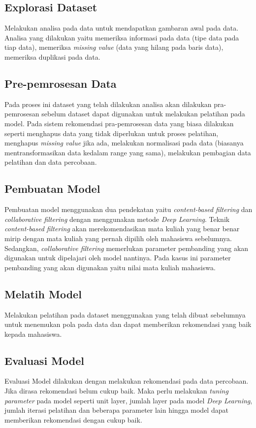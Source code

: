 \begin{adjustwidth}{1em}{0pt}

  \subsection{Explorasi Dataset}
  Melakukan analisa pada data untuk mendapatkan gambaran awal pada data. Analisa yang dilakukan yaitu
  memeriksa informasi pada data (tipe data pada tiap data), memeriksa \emph{missing value} {(data yang hilang pada baris data)},
  memeriksa duplikasi pada data.

  \subsection{Pre-pemrosesan Data}
  Pada proses ini dataset yang telah dilakukan analisa akan dilakukan pra-pemrosesan sebelum dataset dapat digunakan
  untuk melakukan pelatihan pada model. Pada sistem rekomendasi pra-pemrosesan data yang biasa dilakukan seperti menghapus data
  yang tidak diperlukan untuk proses pelatihan, menghapus \emph{missing value} jika ada, melakukan normalisasi pada data (biasanya mentransformasikan data kedalam range yang sama),
  melakukan pembagian data pelatihan dan data percobaan.

  \subsection{Pembuatan Model}
  Pembuatan model menggunakan dua pendekatan yaitu \emph{content-based filtering} dan \emph{collaborative filtering} dengan menggunakan metode \emph{Deep Learning}. Teknik
  \emph{content-based filtering} akan merekomendasikan mata kuliah yang benar benar mirip dengan mata kuliah yang pernah dipilih oleh mahasiswa sebelumnya. Sedangkan, \emph{collaborative filtering}
  memerlukan parameter pembanding yang akan digunakan untuk dipelajari oleh model nantinya. Pada kasus ini parameter pembanding yang akan digunakan yaitu nilai mata kuliah mahasiswa.

  \subsection{Melatih Model}
  Melakukan pelatihan pada dataset menggunakan yang telah dibuat sebelumnya untuk menemukan pola pada data dan dapat memberikan rekomendasi yang baik kepada mahasiswa.

  \subsection{Evaluasi Model}
  Evaluasi Model dilakukan dengan melakukan rekomendasi pada data percobaan. Jika dirasa rekomendasi belum cukup baik. Maka perlu melakukan
  \emph{tuning parameter} pada model seperti unit layer, jumlah layer pada model \emph{Deep Learning}, jumlah iterasi pelatihan dan beberapa parameter lain hingga model dapat memberikan rekomendasi dengan cukup baik.


\end{adjustwidth}

